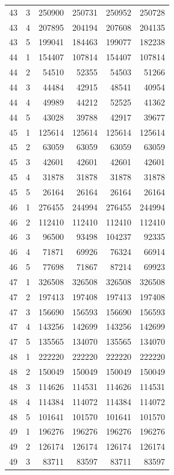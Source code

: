 \begin{longtable}{rrrrrr}
43 & 3 & 250900 & 250731 & 250952 & 250728 \\
43 & 4 & 207895 & 204194 & 207608 & 204135 \\
43 & 5 & 199041 & 184463 & 199077 & 182238 \\
44 & 1 & 154407 & 107814 & 154407 & 107814 \\
44 & 2 & 54510 & 52355 & 54503 & 51266 \\
44 & 3 & 44484 & 42915 & 48541 & 40954 \\
44 & 4 & 49989 & 44212 & 52525 & 41362 \\
44 & 5 & 43028 & 39788 & 42917 & 39677 \\
45 & 1 & 125614 & 125614 & 125614 & 125614 \\
45 & 2 & 63059 & 63059 & 63059 & 63059 \\
45 & 3 & 42601 & 42601 & 42601 & 42601 \\
45 & 4 & 31878 & 31878 & 31878 & 31878 \\
45 & 5 & 26164 & 26164 & 26164 & 26164 \\
46 & 1 & 276455 & 244994 & 276455 & 244994 \\
46 & 2 & 112410 & 112410 & 112410 & 112410 \\
46 & 3 & 96500 & 93498 & 104237 & 92335 \\
46 & 4 & 71871 & 69926 & 76324 & 66914 \\
46 & 5 & 77698 & 71867 & 87214 & 69923 \\
47 & 1 & 326508 & 326508 & 326508 & 326508 \\
47 & 2 & 197413 & 197408 & 197413 & 197408 \\
47 & 3 & 156690 & 156593 & 156690 & 156593 \\
47 & 4 & 143256 & 142699 & 143256 & 142699 \\
47 & 5 & 135565 & 134070 & 135565 & 134070 \\
48 & 1 & 222220 & 222220 & 222220 & 222220 \\
48 & 2 & 150049 & 150049 & 150049 & 150049 \\
48 & 3 & 114626 & 114531 & 114626 & 114531 \\
48 & 4 & 114384 & 114072 & 114384 & 114072 \\
48 & 5 & 101641 & 101570 & 101641 & 101570 \\
49 & 1 & 196276 & 196276 & 196276 & 196276 \\
49 & 2 & 126174 & 126174 & 126174 & 126174 \\
49 & 3 & 83711 & 83597 & 83711 & 83597 \\

\end{longtable}
